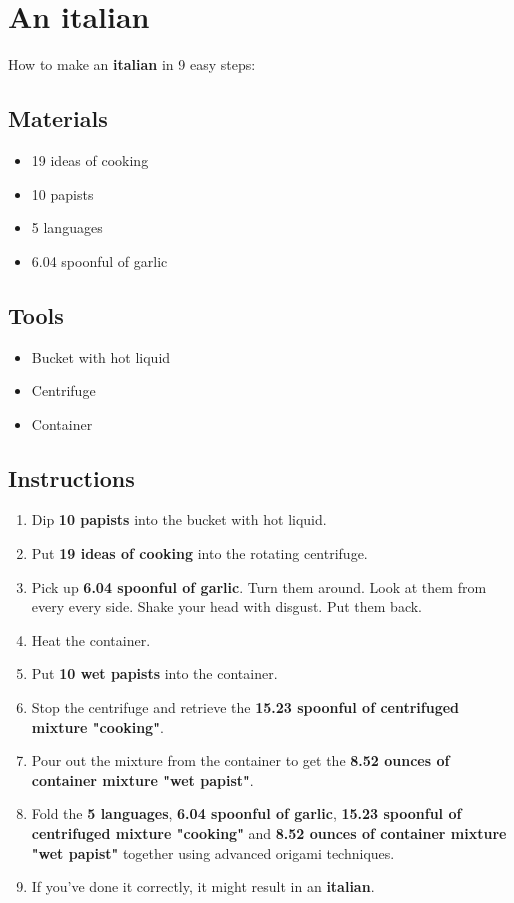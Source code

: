 \documentclass{article}
\begin{document}
\section{An italian}How to make an \textbf{italian} in 9 easy steps:

\subsection{Materials}\begin{itemize}
\item 
19 ideas of cooking
\item 
10 papists
\item 
5 languages
\item 
6.04 spoonful of garlic
\end{itemize}
\subsection{Tools}\begin{itemize}
\item 
Bucket with hot liquid
\item 
Centrifuge
\item 
Container
\end{itemize}
\subsection{Instructions}\begin{enumerate}
\item 
Dip \textbf{10 papists} into the bucket with hot liquid.
\item 
Put \textbf{19 ideas of cooking} into the rotating centrifuge.
\item 
Pick up \textbf{6.04 spoonful of garlic}. Turn them around. Look at them from every every side. Shake your head with disgust. Put them back.
\item 
Heat the container.
\item 
Put \textbf{10 wet papists} into the container.
\item 
Stop the centrifuge and retrieve the \textbf{15.23 spoonful of centrifuged mixture "cooking"}.
\item 
Pour out the mixture from the container to get the \textbf{8.52 ounces of container mixture "wet papist"}.
\item 
Fold the \textbf{5 languages}, \textbf{6.04 spoonful of garlic}, \textbf{15.23 spoonful of centrifuged mixture "cooking"} and \textbf{8.52 ounces of container mixture "wet papist"} together using advanced origami techniques.
\item 
If you've done it correctly, it might result in an \textbf{italian}.
\end{enumerate}
\newpage
\end{document}
